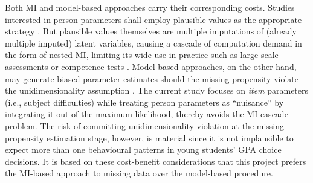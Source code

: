 Both MI and model-based approaches carry their corresponding costs. Studies interested in person parameters shall employ plausible values as the appropriate strategy \parencite{mislevy:1991,mislevy:1993}. But plausible values themselves are multiple imputations of (already multiple imputed) latent variables, causing a cascade of computation demand in the form of nested MI, limiting its wide use in practice such as large-scale assessments or competence tests \parencite{pohl:2014}. Model-based approaches, on the other hand, may generate biased parameter estimates should the missing propensity violate the unidimensionality assumption \parencite{rose:2013}. The current study focuses on \emph{item} parameters (i.e., subject difficulties) while treating person parameters as ``nuisance'' by integrating it out of the maximum likelihood, thereby avoids the MI cascade problem. The risk of committing unidimensionality violation at the missing propensity estimation stage, however, is material since it is not implausible to expect more than one behavioural patterns in young students' GPA choice decisions. It is based on these cost-benefit considerations that this project prefers the MI-based approach to missing data over the model-based procedure.